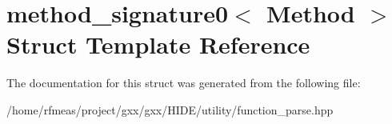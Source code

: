\hypertarget{structmethod__signature0}{}\section{method\+\_\+signature0$<$ Method $>$ Struct Template Reference}
\label{structmethod__signature0}


The documentation for this struct was generated from the following file\+:\begin{DoxyCompactItemize}
\item 
/home/rfmeas/project/gxx/gxx/\+H\+I\+D\+E/utility/function\+\_\+parse.\+hpp\end{DoxyCompactItemize}
